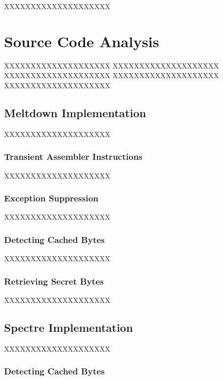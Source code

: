 \documentclass[a4paper,oneside,openright] {scrreprt}
\begin{document}
XXXXXXXXXXXXXXXXXXXX

\chapter{Source Code Analysis}
\label{ch:sourceCodeAnalysis}

XXXXXXXXXXXXXXXXXXXX
XXXXXXXXXXXXXXXXXXXX
XXXXXXXXXXXXXXXXXXXX
XXXXXXXXXXXXXXXXXXXX
XXXXXXXXXXXXXXXXXXXX

\section{Meltdown Implementation}
\label{ch:intro:motivation}

XXXXXXXXXXXXXXXXXXXX


\subsection{Transient Assembler Instructions}
\label{ch:intro:motivation:A}

XXXXXXXXXXXXXXXXXXXX

\subsection{Exception Suppression}
\label{ch:intro:motivation:A}

XXXXXXXXXXXXXXXXXXXX

\subsection{Detecting Cached Bytes}
\label{ch:intro:motivation:A}

XXXXXXXXXXXXXXXXXXXX

\subsection{Retrieving Secret Bytes}
\label{ch:intro:motivation:A}

XXXXXXXXXXXXXXXXXXXX

\section{Spectre Implementation}
\label{ch:intro:motivation}

XXXXXXXXXXXXXXXXXXXX

\subsection{Detecting Cached Bytes}
\label{ch:intro:motivation:A}
\end{document}
